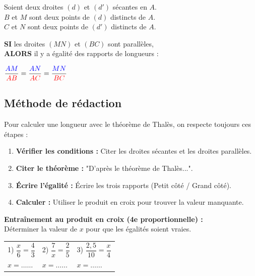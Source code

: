 \documentclass[a4paper]{book}
\begin{document}
    \begin{propriete}
        Soient deux droites $(d)$ et $(d')$ sécantes en $A$. \\
        $B$ et $M$ sont deux points de $(d)$ distincts de $A$. \\
        $C$ et $N$ sont deux points de $(d')$ distincts de $A$.
        
        \medskip
        \textbf{SI} les droites $(MN)$ et $(BC)$ sont parallèles, \\
        \textbf{ALORS} il y a égalité des rapports de longueurs :
        
        \begin{center}
            {\Large $\dfrac{\color{blue}AM}{\color{red}AB} = \dfrac{\color{blue}AN}{\color{red}AC} = \dfrac{\color{blue}MN}{\color{red}BC}$}
        \end{center}
    \end{propriete}
    
    
\subsection{Méthode de rédaction}
    
    \begin{methode}
        Pour calculer une longueur avec le théorème de Thalès, on respecte toujours ces étapes :
        \begin{enumerate}
            \item \textbf{Vérifier les conditions :} Citer les droites sécantes et les droites parallèles.
            \item \textbf{Citer le théorème :} "D'après le théorème de Thalès...".
            \item \textbf{Écrire l'égalité :} Écrire les trois rapports (Petit côté / Grand côté).
            \item \textbf{Calculer :} Utiliser le produit en croix pour trouver la valeur manquante.
        \end{enumerate}
    \end{methode}
    
    \begin{exemple}
        \textbf{Entraînement au produit en croix (4e proportionnelle) :} \\
        Déterminer la valeur de $x$ pour que les égalités soient vraies.\\
        \medskip
        \begin{tabularx}{\textwidth}{XXX}
            1) $\dfrac{x}{6} = \dfrac{4}{3}$ & 2) $\dfrac{7}{x} = \dfrac{2}{5}$ & 3) $\dfrac{2,5}{10} = \dfrac{x}{4}$ \\
            \rule{0pt}{30pt} $x = \dots \dots$ & $x = \dots \dots$ & $x = \dots \dots$
        \end{tabularx}
    \end{exemple}
\end{document}
